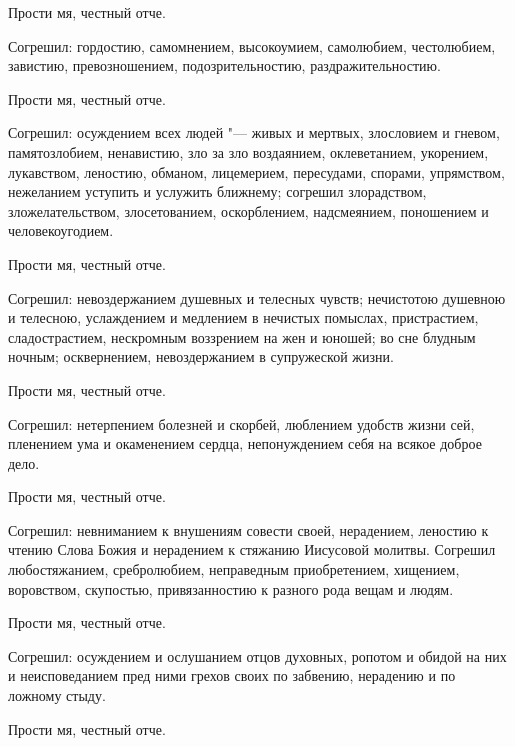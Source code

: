 Прости мя, честный отче. 



Согрешил: гордостию, самомнением, высокоумием, самолюбием, честолюбием, завистию, превозношением, подозрительностию, раздражительностию. 



Прости мя, честный отче. 



Согрешил: осуждением всех людей "--- живых и мертвых, злословием и гневом, памятозлобием, ненавистию, зло за зло воздаянием, оклеветанием, укорением, лукавством, леностию, обманом, лицемерием, пересудами, спорами, упрямством, нежеланием уступить и услужить ближнему; согрешил злорадством, зложелательством, злосетованием, оскорблением, надсмеянием, поношением и человекоугодием. 



Прости мя, честный отче. 



Согрешил: невоздержанием душевных и телесных чувств; нечистотою душевною и телесною, услаждением и медлением в нечистых помыслах, пристрастием, сладострастием, нескромным воззрением на жен и юношей; во сне блудным ночным; осквернением, невоздержанием в супружеской жизни. 



Прости мя, честный отче. 



Согрешил: нетерпением болезней и скорбей, люблением удобств жизни сей, пленением ума и окаменением сердца, непонуждением себя на всякое доброе дело. 



Прости мя, честный отче. 



Согрешил: невниманием к внушениям совести своей, нерадением, леностию к чтению Слова Божия и нерадением к стяжанию Иисусовой молитвы. Согрешил любостяжанием, сребролюбием, неправедным приобретением, хищением, воровством, скупостью, привязанностию к разного рода вещам и людям. 



Прости мя, честный отче. 



Согрешил: осуждением и ослушанием отцов духовных, ропотом и обидой на них и неисповеданием пред ними грехов своих по забвению, нерадению и по ложному стыду. 



Прости мя, честный отче. 



